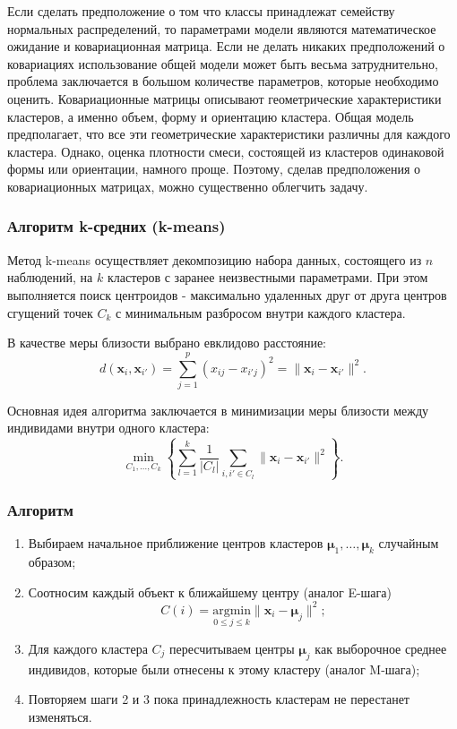 \documentclass[10pt]{article}
\renewcommand{\leq}{\leqslant}
\begin{document}
Если сделать предположение о том что классы принадлежат семейству нормальных распределений, то параметрами модели являются математическое ожидание и ковариационная матрица. Если не делать никаких предположений о ковариациях использование общей модели может быть весьма затруднительно, проблема заключается в большом количестве параметров, которые необходимо оценить. Ковариационные матрицы описывают геометрические характеристики кластеров, а именно объем, форму и ориентацию кластера. Общая модель предполагает, что все эти геометрические характеристики различны для каждого кластера. Однако, оценка плотности смеси, состоящей из кластеров одинаковой формы или ориентации, намного проще. Поэтому, сделав предположения о ковариационных матрицах, можно существенно облегчить задачу.

\subsubsection{Алгоритм k-средних (k-means)}
	Метод k-means осуществляет декомпозицию набора данных, состоящего из $n$ наблюдений, на $k$ кластеров с заранее неизвестными параметрами. При этом выполняется поиск центроидов - максимально удаленных друг от друга центров сгущений точек $C_k$ с минимальным разбросом внутри каждого кластера. 
	
	В качестве меры близости выбрано евклидово расстояние: $$ d(\pmb x_{i}, \pmb x_{i'}) = \sum\limits_{j=1}^p (x_{ij} - x_{i'j})^{2} = \| \pmb x_{i} - \pmb x_{i'} \|^{2}. $$
	
	Основная идея алгоритма заключается в минимизации меры близости между индивидами внутри одного кластера: $$ \underset{C_{1},\ldots, C_{k}}\min \left\{ \sum\limits_{l=1}^k \frac{1}{|C_{l}|} \sum\limits_{i,i' \in C_{l}} \| \pmb x_{i} - \pmb x_{i'} \|^{2} \right\}. $$
	
	
	\subsubsection*{Алгоритм}
	
	\begin{enumerate}
		\item Выбираем начальное приближение центров кластеров $\pmb \mu_{1},\ldots, \pmb \mu_{k}$ случайным образом; 
		\item Соотносим каждый объект к ближайшему центру (аналог E-шага) $$C(i) = \underset{0 \leq j \leq k}{\text{argmin}} \|\pmb x_{i} - \pmb \mu_{j} \|^{2};$$
		\item Для каждого кластера $C_{j}$ пересчитываем центры $\pmb \mu_{j}$ как выборочное среднее индивидов, которые были отнесены к этому кластеру (аналог M-шага);
		\item  Повторяем шаги 2 и 3 пока принадлежность кластерам не перестанет изменяться.
	\end{enumerate}
	
\end{document}
